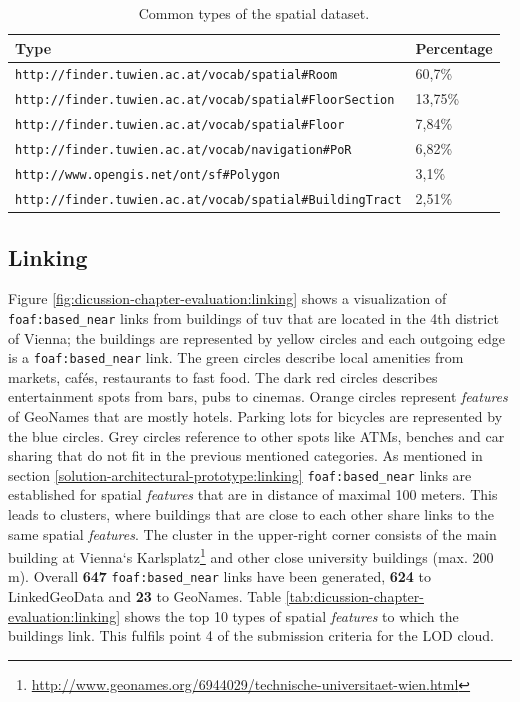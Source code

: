 \documentclass[draft,final]{vutinfth} %
\begin{document}
\begin{table}
  \centering
  \begin{tabular}{| l | l |}
    \hline
       Type & Percentage \\ \hline
       \texttt{http://finder.tuwien.ac.at/vocab/spatial\#Room} & 60,7\% \\ \hline
       \texttt{http://finder.tuwien.ac.at/vocab/spatial\#FloorSection} & 13,75\% \\ \hline
       \texttt{http://finder.tuwien.ac.at/vocab/spatial\#Floor} & 7,84\% \\ \hline
       \texttt{http://finder.tuwien.ac.at/vocab/navigation\#PoR} & 6,82\% \\ \hline
       \texttt{http://www.opengis.net/ont/sf\#Polygon} & 3,1\% \\ \hline
       \texttt{http://finder.tuwien.ac.at/vocab/spatial\#BuildingTract} & 2,51\% \\ \hline
  \end{tabular}
  \caption{Common types of the spatial dataset.}
  \label{tab:dicussion-chapter-evaluation:dataset}
\end{table}

\subsection{Linking}
\label{dicussion-chapter-evaluation:linking}
Figure \ref{fig:dicussion-chapter-evaluation:linking} shows a visualization of \texttt{foaf:based\_near} links from buildings of \gls{tuv} that are located in the 4th district of Vienna; the buildings are represented by yellow circles and each outgoing edge is a \texttt{foaf:based\_near} link. The green circles describe local amenities from markets, cafés, restaurants to fast food. The dark red circles describes entertainment spots from bars, pubs to cinemas. Orange circles represent \textit{features} of GeoNames that are mostly hotels. Parking lots for bicycles are represented by the blue circles. Grey circles reference to other spots like ATMs, benches and car sharing that do not fit in the previous mentioned categories. As mentioned in section \ref{solution-architectural-prototype:linking} \texttt{foaf:based\_near} links are established for spatial \textit{features} that are in distance of maximal 100 meters. This leads to clusters, where buildings that are close to each other share links to the same spatial \textit{features}. The cluster in the upper-right corner consists of the main building at Vienna`s Karlsplatz\footnote{\url{http://www.geonames.org/6944029/technische-universitaet-wien.html}} and other close university buildings (max. 200 m). Overall \textbf{647} \texttt{foaf:based\_near} links have been generated, \textbf{624} to LinkedGeoData and \textbf{23} to GeoNames. Table \ref{tab:dicussion-chapter-evaluation:linking} shows the top 10 types of spatial \textit{features} to which the buildings link. This fulfils point 4 of the submission criteria for the LOD cloud.
\end{document}
